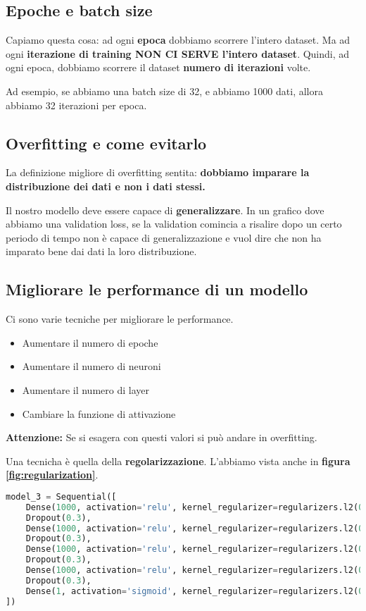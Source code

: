 \subsection{Epoche e batch size}

Capiamo questa cosa: ad ogni \textbf{epoca} dobbiamo scorrere l'intero dataset.
Ma ad ogni \textbf{iterazione di training NON CI SERVE l'intero dataset}.
Quindi, ad ogni epoca, dobbiamo scorrere il dataset \textbf{numero di
    iterazioni} volte.

Ad esempio, se abbiamo una batch size di 32, e abbiamo 1000 dati, allora
abbiamo 32 iterazioni per epoca.

\subsection{Overfitting e come evitarlo}

La definizione migliore di overfitting sentita: \textbf{dobbiamo imparare la
    distribuzione dei dati e non i dati stessi.}

Il nostro modello deve essere capace di \textbf{generalizzare}. In un grafico
dove abbiamo una validation loss, se la validation comincia a risalire dopo un
certo periodo di tempo non è capace di generalizzazione e vuol dire che non ha
imparato bene dai dati la loro distribuzione.

\subsection{Migliorare le performance di un modello}

Ci sono varie tecniche per migliorare le performance.

\begin{itemize}
    \item Aumentare il numero di epoche
    \item Aumentare il numero di neuroni
    \item Aumentare il numero di layer
    \item Cambiare la funzione di attivazione
\end{itemize}

\textbf{Attenzione:} Se si esagera con questi valori si può andare in overfitting.

Una tecnicha è quella della \textbf{regolarizzazione}. L'abbiamo vista anche in
\textbf{figura \ref{fig:regularization}}.%

\begin{lstlisting}[language=Python]
    model_3 = Sequential([
    Dense(1000, activation='relu', kernel_regularizer=regularizers.l2(0.01), input_shape=(10,)),
    Dropout(0.3),
    Dense(1000, activation='relu', kernel_regularizer=regularizers.l2(0.01)),
    Dropout(0.3),
    Dense(1000, activation='relu', kernel_regularizer=regularizers.l2(0.01)),
    Dropout(0.3),
    Dense(1000, activation='relu', kernel_regularizer=regularizers.l2(0.01)),
    Dropout(0.3),
    Dense(1, activation='sigmoid', kernel_regularizer=regularizers.l2(0.01)),
])
\end{lstlisting}

